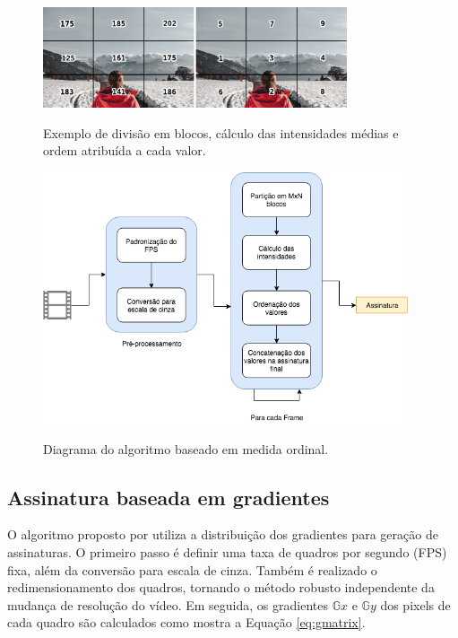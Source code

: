 	\begin{figure}[!htb]
        \centering
        \caption{Exemplo de divisão em blocos, cálculo das intensidades médias e ordem atribuída a cada valor.}
        \includegraphics[width=0.8\textwidth]{dados/figuras/mo_final.png}
        \label{fig:medidaord}
    \end{figure}

 \begin{figure}[!htb]
      \centering
      \caption{Diagrama do algoritmo baseado em medida ordinal.}
      \includegraphics[width=0.96\textwidth]{dados/figuras/diagramas/Diag-MO}
       	\label{fig:dia_ordinal}
    \end{figure}  

%
%


\subsection{Assinatura baseada em gradientes}
\label{sec:gradientes}

	O algoritmo proposto por  utiliza a distribuição dos gradientes para geração de assinaturas. O primeiro passo é definir uma taxa de quadros por segundo (FPS) fixa, além da conversão para escala de cinza. Também é realizado o redimensionamento dos quadros, tornando o método robusto independente da mudança de resolução do vídeo. Em seguida, os gradientes $\mathbb{G}x$ e $\mathbb{G}y$ dos pixels de cada quadro são calculados como mostra a Equação \ref{eq:gmatrix}.

